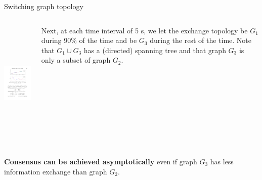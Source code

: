 \begin{frame}{Switching graph topology}

\begin{columns}
 \begin{column}{.70\textwidth}
	\begin{center}
		\includegraphics[height=6cm]{images/Switch5.pdf}
	\end{center}
	\vskip 0.3cm
 \end{column}

 \begin{column}{.30\textwidth}
 	\vskip 0.3cm
	 Next, at each time interval of 5 s, we let the exchange topology be $G_1$ during 90\% of the time 
	 and be $G_3$ during the rest of the time. 
	 Note that $G_1 \cup G_3$ has a (directed) spanning tree and that graph $G_3$ is only a subset of graph $G_2$.
 \end{column}
\end{columns}
{\textcolor{green!40!black}{\fontsize{13}{15}\textbf{Consensus can be achieved asymptotically}}} even if graph $G_3$ has less information exchange than graph $G_2$.

\end{frame}